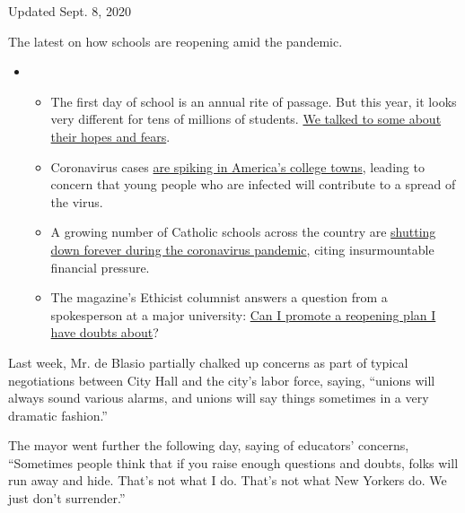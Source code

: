 Updated Sept. 8, 2020

The latest on how schools are reopening amid the pandemic.

\begin{itemize}
\item
  \begin{itemize}
  \tightlist
  \item
    The first day of school is an annual rite of passage. But this year,
    it looks very different for tens of millions of students.
    \href{https://www.nytimes3xbfgragh.onion/2020/09/05/us/virtual-return-to-school-covid.html?action=click\&pgtype=Article\&state=default\&region=MAIN_CONTENT_3\&context=storylines_keepup}{We
    talked to some about their hopes and fears}.
  \item
    Coronavirus cases
    \href{https://www.nytimes3xbfgragh.onion/2020/09/06/us/colleges-coronavirus-students.html?action=click\&pgtype=Article\&state=default\&region=MAIN_CONTENT_3\&context=storylines_keepup}{are
    spiking in America's college towns}, leading to concern that young
    people who are infected will contribute to a spread of the virus.
  \item
    A growing number of Catholic schools across the country are
    \href{https://www.nytimes3xbfgragh.onion/2020/09/05/us/catholic-school-closings.html?action=click\&pgtype=Article\&state=default\&region=MAIN_CONTENT_3\&context=storylines_keepup}{shutting
    down forever during the coronavirus pandemic}, citing insurmountable
    financial pressure.
  \item
    The magazine's Ethicist columnist answers a question from a
    spokesperson at a major university:
    \href{https://www.nytimes3xbfgragh.onion/2020/09/08/magazine/university-reopening-safety-ethics.html?action=click\&pgtype=Article\&state=default\&region=MAIN_CONTENT_3\&context=storylines_keepup}{Can
    I promote a reopening plan I have doubts about}?
  \end{itemize}
\end{itemize}

Last week, Mr. de Blasio partially chalked up concerns as part of
typical negotiations between City Hall and the city's labor force,
saying, ``unions will always sound various alarms, and unions will say
things sometimes in a very dramatic fashion.''

The mayor went further the following day, saying of educators' concerns,
``Sometimes people think that if you raise enough questions and doubts,
folks will run away and hide. That's not what I do. That's not what New
Yorkers do. We just don't surrender.''

